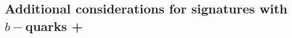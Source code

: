 %
%

 \subsection{\texorpdfstring{Additional considerations for signatures with $b-$quarks + \MET}{Additional considerations for signatures  with b-quarks + \MET}}
 \label{sec:singleb}
 
